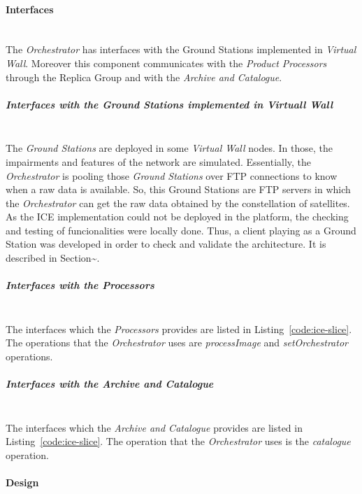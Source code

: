 \paragraph{Interfaces}~\\

The \emph{Orchestrator} has interfaces with the Ground Stations implemented in
\emph{Virtual Wall}. Moreover this component  communicates with the \emph{Product Processors} through the Replica
Group and with the
\emph{Archive and Catalogue}. 

\subparagraph{Interfaces with the Ground Stations implemented in Virtuall
  Wall}~\\

The \emph{Ground Stations} are deployed in some \emph{Virtual Wall} nodes. In
those, the impairments and features of the network are simulated. Essentially,
the \emph{Orchestrator} is pooling those \emph{Ground Stations} over \ac{FTP}
connections to know when a raw data is available. So, this Ground Stations are
\ac{FTP} servers in which the \emph{Orchestrator} can get the raw data obtained
by the constellation of satellites. 
As the ICE implementation could not be
deployed in the \bonfire platform, the checking and testing of funcionalities
were locally done. Thus, a client playing as a Ground Station was developed in
order to check and validate the architecture. It is described in Section\~{}. 

\subparagraph{Interfaces with the  Processors}~\\

The interfaces which the \emph{Processors} provides are listed in
Listing~\ref{code:ice-slice}. The operations that the \emph{Orchestrator} uses
are \emph{processImage} and \emph{setOrchestrator} operations. 

\subparagraph{Interfaces with the Archive and Catalogue}~\\

The interfaces which the \emph{Archive and Catalogue} provides are listed in
Listing~\ref{code:ice-slice}. The operation that the \emph{Orchestrator} uses is
the \emph{catalogue} operation.


\paragraph{Design}~\\

